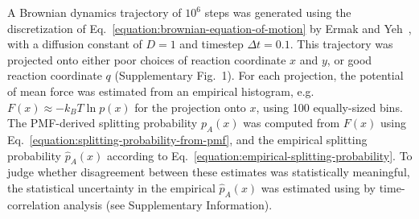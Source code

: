 \documentclass[aps,prl,twocolumn,superscriptaddress,floatfix]{revtex4-1}
\begin{document}
A Brownian dynamics trajectory of $10^6$ steps was generated using the discretization of Eq.~\ref{equation:brownian-equation-of-motion} by Ermak and Yeh~\cite{ermak-yeh:cpl:1974:brownian-dynamics,ermak:jcp:1975:brownian-dynamics}, with a diffusion constant of $D = 1$ and timestep $\Delta t = 0.1$.
This trajectory was projected onto either poor choices of reaction coordinate $x$ and $y$, or good reaction coordinate $q$ (Supplementary Fig.~1).
For each projection, the potential of mean force was estimated from an empirical histogram, e.g.~$F(x) \approx - k_B T \ln p(x)$ for the projection onto $x$, using 100 equally-sized bins.
The PMF-derived splitting probability $p_A(x)$ was computed from $F(x)$ using Eq.~\ref{equation:splitting-probability-from-pmf}, and the empirical splitting probability $\hat{p}_A(x)$ according to Eq.~\ref{equation:empirical-splitting-probability}.
To judge whether disagreement between these estimates was statistically meaningful, the statistical uncertainty in the empirical $\hat{p}_A(x)$ was estimated using by time-correlation analysis (see Supplementary Information).

\end{document}
